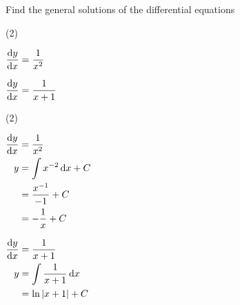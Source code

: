 \documentclass[11pt,a4paper]{book}
\begin{document}
\begin{example}

Find the general solutions of the differential equations

\begin{tasks}[label=(\alph*),label-width=3.5ex](2)

\task  ${\displaystyle \frac{{\rm d}y}{{\rm d}x}=\frac{1}{x^{2}}}$

\task  ${\displaystyle \frac{{\rm d}y}{{\rm d}x}=\frac{1}{x+1}}$

\end{tasks}

\Solution

\begin{tasks}[label=(\alph*),label-width=3.5ex](2)

\task
$
\begin{aligned}[t]
\frac{{\rm d}y}{{\rm d}x} & =\frac{1}{x^{2}}\\
y & =\int x^{-2}\, \mathrm{d}x+C\\
 & =\frac{x^{-1}}{-1}+C\\
 & =-\frac{1}{x}+C
\end{aligned}
$

\task
$
\begin{aligned}[t]
\frac{{\rm d}y}{{\rm d}x} & =\frac{1}{x+1}\\
y & =\int\frac{1}{x+1}\, \mathrm{d}x\\
 & =\ln\left|x+1\right|+C
\end{aligned}
$

\end{tasks}

\end{example}
\end{document}
